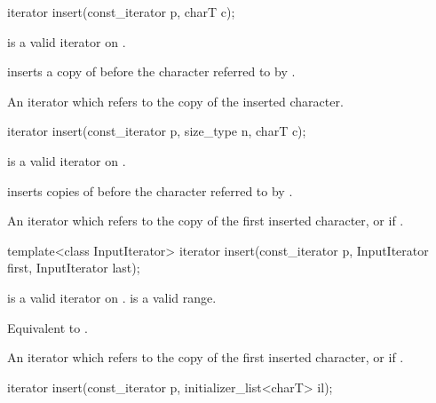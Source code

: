 %
%
\begin{itemdecl}
iterator insert(const_iterator p, charT c);
\end{itemdecl}

\begin{itemdescr}
\pnum
\requires
{} is a valid iterator on
.

\pnum
\effects
inserts a copy of  before the character referred to by .

\pnum
\returns
An iterator which refers to the copy of the inserted character.
\end{itemdescr}

%
%
\begin{itemdecl}
iterator insert(const_iterator p, size_type n, charT c);
\end{itemdecl}

\begin{itemdescr}
\pnum
\requires
{} is a valid iterator on
.

\pnum
\effects
inserts  copies of  before the character referred to by .

\pnum
\returns An iterator which refers to the copy of the first inserted character, or
 if .
\end{itemdescr}

%
%
\begin{itemdecl}
template<class InputIterator>
  iterator insert(const_iterator p, InputIterator first, InputIterator last);
\end{itemdecl}

\begin{itemdescr}
\pnum
\requires
{} is a valid iterator on
.
\tcode{[first,last)}
is a valid range.

\pnum
\effects
Equivalent to
.

\pnum
\returns An iterator which refers to the copy of the first inserted character, or
 if .
\end{itemdescr}

%
%
\begin{itemdecl}
iterator insert(const_iterator p, initializer_list<charT> il);
\end{itemdecl}

